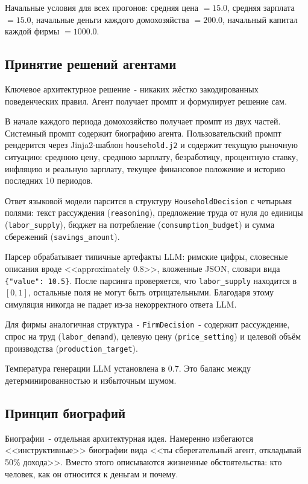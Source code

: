 \documentclass[12pt, a4paper]{article}
\begin{document}
Начальные условия для всех прогонов: средняя цена $= 15.0$, средняя зарплата $= 15.0$, начальные деньги каждого домохозяйства $= 200.0$, начальный капитал каждой фирмы $= 1000.0$.

\subsection{Принятие решений агентами}

Ключевое архитектурное решение~- никаких жёстко закодированных поведенческих правил. Агент получает промпт и формулирует решение сам.

В начале каждого периода домохозяйство получает промпт из двух частей. Системный промпт содержит биографию агента. Пользовательский промпт рендерится через Jinja2-шаблон \texttt{household.j2} и содержит текущую рыночную ситуацию: среднюю цену, среднюю зарплату, безработицу, процентную ставку, инфляцию и реальную зарплату, текущее финансовое положение и историю последних 10 периодов.

Ответ языковой модели парсится в структуру \texttt{HouseholdDecision} с четырьмя полями: текст рассуждения (\texttt{reasoning}), предложение труда от нуля до единицы (\texttt{labor\_supply}), бюджет на потребление (\texttt{consumption\_budget}) и сумма сбережений (\texttt{savings\_amount}).

Парсер обрабатывает типичные артефакты LLM: римские цифры, словесные описания вроде <<approximately 0.8>>, вложенные JSON, словари вида \texttt{\{"value": 10.5\}}. После парсинга проверяется, что \texttt{labor\_supply} находится в $[0, 1]$, остальные поля не могут быть отрицательными. Благодаря этому симуляция никогда не падает из-за некорректного ответа LLM.

Для фирмы аналогичная структура~- \texttt{FirmDecision}~- содержит рассуждение, спрос на труд (\texttt{labor\_demand}), целевую цену (\texttt{price\_setting}) и целевой объём производства (\texttt{production\_target}).

Температура генерации LLM установлена в $0.7$. Это баланс между детерминированностью и избыточным шумом.

\subsection{Принцип биографий}

Биографии~- отдельная архитектурная идея. Намеренно избегаются <<инструктивные>> биографии вида <<ты сберегательный агент, откладывай 50\% дохода>>. Вместо этого описываются жизненные обстоятельства: кто человек, как он относится к деньгам и почему.
\end{document}
